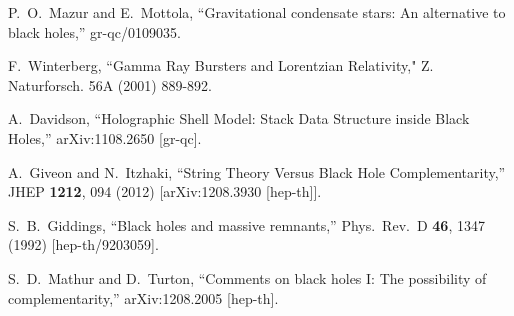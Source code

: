 \documentclass[12pt]{article}
\begin{document}
\begin{thebibliography}{99}
  P.~O.~Mazur and E.~Mottola,
  ``Gravitational condensate stars: An alternative to black holes,''
  gr-qc/0109035.

F.~Winterberg, ``Gamma Ray Bursters and Lorentzian Relativity," Z. Naturforsch. 56A (2001)  889-892.

  A.~Davidson,
  ``Holographic Shell Model: Stack Data Structure inside Black Holes,''
  arXiv:1108.2650 [gr-qc].

  A.~Giveon and N.~Itzhaki,
  ``String Theory Versus Black Hole Complementarity,''
  JHEP {\bf 1212}, 094 (2012)
  [arXiv:1208.3930 [hep-th]].

  S.~B.~Giddings,
  ``Black holes and massive remnants,''
  Phys.\ Rev.\ D {\bf 46}, 1347 (1992)
  [hep-th/9203059].


  S.~D.~Mathur and D.~Turton,
  ``Comments on black holes I: The possibility of complementarity,''
  arXiv:1208.2005 [hep-th].


\end{thebibliography}



\end{document}
